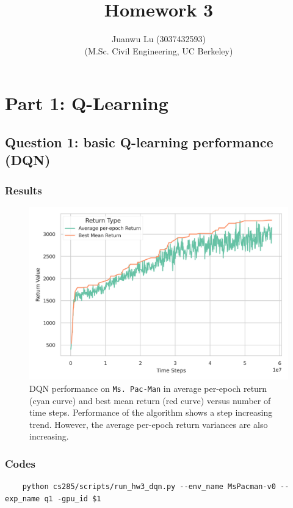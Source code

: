 \documentclass[10pt, letterpaper]{article}
\title{%
    \textbf{Homework 3}
}
\author{Juanwu Lu (3037432593)\\ \small(M.Sc. Civil Engineering, UC Berkeley)}
\date{}
\begin{document}
\maketitle
{}
\thispagestyle{fancy}
\pagestyle{plain}

\section{Part 1: Q-Learning}

\subsection*{Question 1: basic Q-learning performance (DQN)}
\subsubsection*{Results}
\begin{figure}[thbp]
    \centering
    \includegraphics[width=\textwidth]{./img/q1.png}
    \caption{DQN performance on \texttt{Ms. Pac-Man} in average per-epoch return (cyan curve) and best mean return (red curve) versus number of time steps. Performance of the algorithm shows a step increasing trend. However, the average per-epoch return variances are also increasing.}
    \label{fig:1}
\end{figure}
\subsubsection*{Codes}
\begin{lstlisting}
    python cs285/scripts/run_hw3_dqn.py --env_name MsPacman-v0 --exp_name q1 -gpu_id $1
\end{lstlisting}
\end{document}
